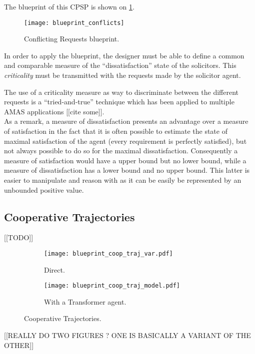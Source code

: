 The blueprint of this CPSP is shown on \figurename{} \ref{blueprint_conflicts}.

\begin{figure}
\centering
\texttt{[image: blueprint\_conflicts]}
\caption{Conflicting Requests blueprint.}\label{blueprint_conflicts}
\end{figure}

In order to apply the blueprint, the designer must be able to define a common and comparable measure of the \enquote{dissatisfaction} state of the solicitors. This \emph{criticality} must be transmitted with the requests made by the solicitor agent.


The use of a criticality measure as way to discriminate between the different requests is a \enquote{tried-and-true} technique which has been applied to multiple AMAS applications [[cite some]].\\
As a remark, a measure of dissatisfaction presents an advantage over a measure of satisfaction in the fact that it is often possible to estimate the state of maximal satisfaction of the agent (every requirement is perfectly satisfied), but not always possible to do so for the maximal dissatisfaction. Consequently a measure of satisfaction would have a upper bound but no lower bound, while a measure of dissatisfaction has a lower bound and no upper bound. This latter is easier to manipulate and reason with as it can be easily be represented by an unbounded positive value.

\subsection{Cooperative Trajectories}

[[TODO]]

\begin{figure}
\centering
	\begin{subfigure}{0.49\textwidth}
		\centering
		\texttt{[image: blueprint\_coop\_traj\_var.pdf]}
		\caption{Direct.}
	\end{subfigure}
	\begin{subfigure}{0.49\textwidth}
		\centering
		\texttt{[image: blueprint\_coop\_traj\_model.pdf]}
		\caption{With a Transformer agent.}
	\end{subfigure}
\caption{Cooperative Trajectories.}\label{blueprint_coop_traj}
\end{figure}

[[REALLY DO TWO FIGURES ? ONE IS BASICALLY A VARIANT OF THE OTHER]]

